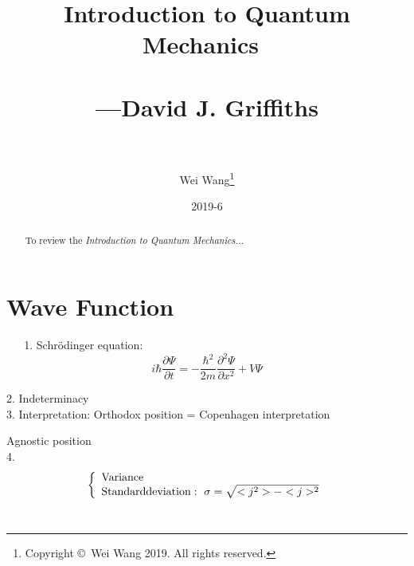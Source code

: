 \documentclass[12pt, 
]{article}
\begin{document}
	\title{{\bf Introduction to Quantum Mechanics}~\\{\bf\Large ~\\ ---David J. Griffiths}}
	\author{~\\~\\Wei Wang\footnote{Copyright \copyright ~Wei Wang 2019. All rights reserved.}}
	\date{2019-6}
	\maketitle

	\thispagestyle{empty}

	\newpage
	\tableofcontents
	\thispagestyle{empty}%

	\newpage
	\begin{abstract}
		To review the \it{Introduction to Quantum Mechanics}...

	\end{abstract}

	{
	\lhead{}
	\chead{}
	}

	\setcounter{page}{1}%

	\newpage

	\lhead{}
	\chead{}
	\rhead{\leftmark}

	\section{Wave Function}
	$\phantom{aaa}$1. Schr\"odinger equation:
	\begin{equation}\label{eq:1}
		i\hbar \frac{\partial \varPsi}{\partial t}=-\frac{\hbar^2}{2m}\frac{\partial^2\varPsi}{\partial x^2}+V\varPsi
	\end{equation}
	
	2. Indeterminacy
	~\\

	3. Interpretation:
	Orthodox position = Copenhagen interpretation
	
	Agnostic position
	~\\

	4. \[
		\left\{
		\begin{array}{l}
			{\rm Variance}\\
			{\rm Standard deviation}:~\sigma=\sqrt{<j^2>-<j>^2}\\
		\end{array}
		\right.
		\]
	~\\
		
\end{document}

